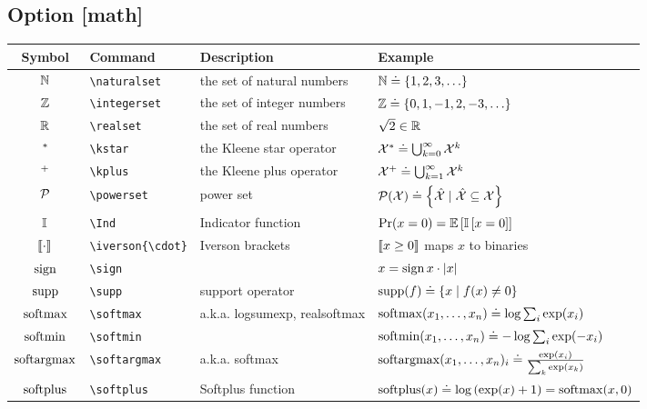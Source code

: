 \documentclass{article}
\begin{document}
\subsection*{Option [math]}

\begin{tabular}{clll}
  \toprule
  Symbol & Command & Description & Example \\
  \midrule
  $\mathbb{N}$ & \verb|\naturalset| & the set of natural numbers & $\mathbb{N} \doteq \{ 1, 2, 3, \ldots \}$ \\
  $\mathbb{Z}$ & \verb|\integerset| & the set of integer numbers & $\mathbb{Z} \doteq \{ 0, 1, -1, 2, -3, \ldots \}$ \\
  $\mathbb{R}$ & \verb|\realset| & the set of real numbers & $\sqrt{2} \in \mathbb{R}$ \\
  $^{*}$ & \verb|\kstar| & the Kleene star operator & $\mathcal{X}^{*} \doteq \bigcup_{k=0}^\infty \mathcal{X}^k$ \\
  $^{+}$ & \verb|\kplus| & the Kleene plus operator & $\mathcal{X}^{+} \doteq \bigcup_{k=1}^\infty \mathcal{X}^k$ \\
  \midrule
  $\mathcal{P}$ & \verb|\powerset| & power set & $\mathcal{P}(\mathcal{X}) \doteq \left\{ \hat{\mathcal{X}} \mid \hat{\mathcal{X}} \subseteq \mathcal{X} \right\}$ \\
  \midrule
  $\operatorname{\mathbb{I}}$ & \verb|\Ind| & Indicator function & $\Pr(x=0) = \operatorname{\mathbb{E}}\left[ \operatorname{\mathbb{I}}\left[ x=0 \right] \right]$ \\
  \midrule
  $\llbracket\cdot\rrbracket$ & \verb|\iverson{\cdot}| & Iverson brackets & $\llbracket x \geq 0 \rrbracket$ maps $x$ to binaries \\
  \midrule
  $\operatorname{sign}$ & \verb|\sign| & & $x = \operatorname{sign}{x} \cdot |x|$ \\
  $\operatorname{supp}$ & \verb|\supp| & support operator & $\operatorname{supp}(f) \doteq \{ x \mid f(x) \neq 0 \}$ \\
  \midrule
  $\operatorname*{softmax}$ & \verb|\softmax| & a.k.a. logsumexp, realsoftmax\footnotemark[1] & $\operatorname*{softmax}(x_1, \ldots, x_n) \doteq \log\sum_i \exp(x_i)$ \\
  $\operatorname*{softmin}$ & \verb|\softmin| & & $\operatorname*{softmin}(x_1, \ldots, x_n) \doteq -\log\sum_i \exp(-x_i)$ \\
  $\operatorname*{softargmax}$ & \verb|\softargmax| & a.k.a. softmax\footnotemark[1] & $\operatorname*{softargmax}(x_1, \ldots, x_n)_i \doteq \frac{ \exp(x_i) }{ \sum_k \exp(x_k) }$ \\
  $\operatorname*{softplus}$ & \verb|\softplus| & Softplus function & $\operatorname*{softplus}(x) \doteq \log\left( \exp(x) + 1 \right) = \operatorname*{softmax}(x, 0)$ \\
  \bottomrule
\end{tabular}
\end{document}
